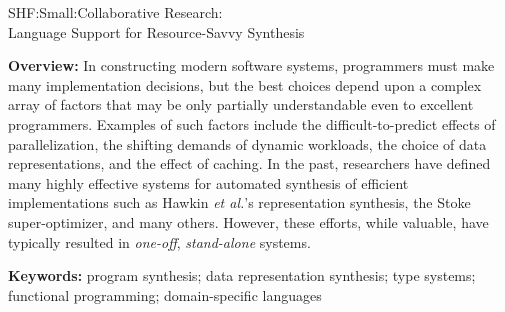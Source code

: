 \documentclass[12pt]{article}
\begin{document}
\setcounter{page}{1}

 \begin{large}
\begin{center}
SHF:Small:Collaborative Research: \\
Language Support for Resource-Savvy Synthesis
\end{center}
\end{large}

\noindent
\textbf{Overview:}   
In constructing modern software systems, 
programmers must make many implementation decisions, but
the best choices depend upon a complex array of factors that may be
only partially understandable even to excellent programmers.
Examples of such factors include the difficult-to-predict effects of 
parallelization, the shifting demands of dynamic workloads,  the
choice of data representations, and the effect of caching.
In the past, researchers have defined many highly effective systems 
for automated synthesis of efficient
implementations such as Hawkin \emph{et al.}'s representation
synthesis, the Stoke super-optimizer, and many others.
However, these efforts, while valuable, have typically resulted in 
\emph{one-off}, \emph{stand-alone} systems.

\noindent\textbf{Keywords:} program synthesis; data representation synthesis;
type systems; functional programming; domain-specific languages
\end{document}
